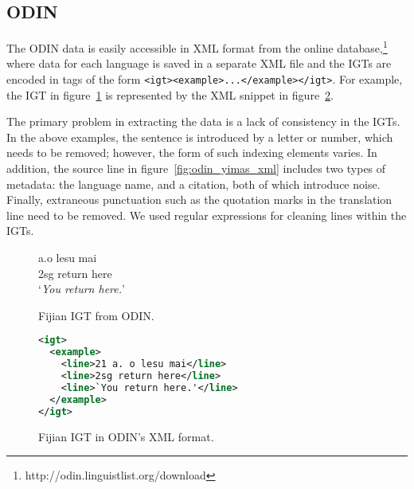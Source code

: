 \subsection{ODIN}

The ODIN data is easily accessible in XML format from the online database,\footnote{http://odin.linguistlist.org/download} where data for each language is saved in a separate XML file and the IGTs are encoded in tags of the form \texttt{<igt><example>...</example></igt>}.  For example, the IGT in figure~\ref{fig:odin_fijian} is represented by the XML snippet in figure~\ref{fig:odin_fijian_xml}.




The primary problem in extracting the data is a lack of consistency in
the IGTs. In the above examples, the sentence is introduced by a
letter or number, which needs to be removed; however, the form of such
indexing elements varies. In addition, the source line in figure~\ref{fig:odin_yimas_xml}
includes two types of metadata: the language name, and a citation,
both of which introduce noise.  Finally, extraneous punctuation such
as the quotation marks in the translation line need to be removed. We used regular expressions for cleaning lines within the IGTs.


\begin{figure}[t]
 a.\quad o lesu mai \\
\indent \qquad\qquad 2sg return here \\
\indent \qquad\qquad `\emph{You return here.}' \\
\caption{Fijian IGT from ODIN.} \label{fig:odin_fijian}
\end{figure}


\begin{figure}[t]
\small
\begin{lstlisting}[language=XML]
<igt>
  <example>
    <line>21 a. o lesu mai</line>
    <line>2sg return here</line>
    <line>`You return here.'</line>
  </example>
</igt>
\end{lstlisting} 
\caption{Fijian IGT in ODIN's XML format.} \label{fig:odin_fijian_xml}
\end{figure}

